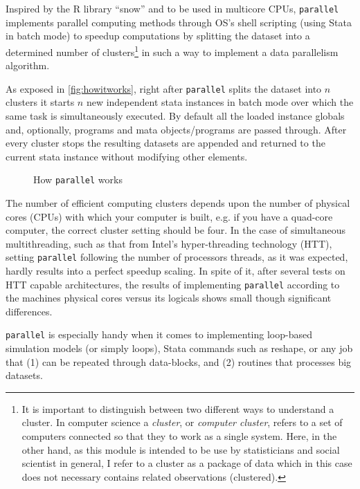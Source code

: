 \documentclass[letterpaper, 10pt]{article}
\begin{document}
Inspired by the R library ``snow'' and to be used in multicore CPUs, {\tt parallel} implements parallel computing methods through OS's shell scripting (using Stata in batch mode) to speedup computations by splitting the dataset into a determined number of clusters\footnote{It is important to distinguish between two different ways to understand a cluster. In computer science a \emph{cluster}, or \emph{computer cluster}, refers to a set of computers connected so that they to work as a single system. Here, in the other hand, as this module is intended to be use by statisticians and social scientist in general, I refer to a cluster as a package of data which in this case does not necessary contains related observations (clustered).} in such a way to implement a data parallelism algorithm.

As exposed in \autoref{fig:howitworks}, right after {\tt parallel} splits the dataset into $n$ clusters it starts $n$ new independent stata instances in batch mode over which the same task is simultaneously executed. By default all the loaded instance globals and, optionally, programs and mata objects/programs are passed through. After every cluster stops the resulting datasets are appended and returned to the current stata instance without modifying other elements.

\begin{figure}[tp]
\centering
\caption{How {\tt parallel} works\label{fig:howitworks}}
\bigskip

\end{figure}

\pagebreak

The number of efficient computing clusters depends upon the number of physical cores (CPUs) with which your computer is built, e.g. if you have a quad-core computer, the correct cluster setting should be four. In the case of simultaneous multithreading, such as that from Intel's hyper-threading technology (HTT), setting {\tt parallel} following the number of processors threads, as it was expected, hardly results into a perfect speedup scaling. In spite of it, after several tests on HTT capable architectures, the results of implementing {\tt parallel} according to the machines physical cores versus its logicals shows small though significant differences.

{\tt parallel} is especially handy when it comes to implementing loop-based simulation models (or simply loops), Stata commands such as reshape, or any job that (1) can be repeated through data-blocks, and (2) routines that processes big datasets.
\end{document}
